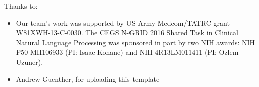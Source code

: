 \noindent
Thanks to:
\begin{itemize}
    \item Our team's work was supported by US Army Medcom/TATRC grant W81XWH-13-C-0030.
The CEGS N-GRID 2016 Shared Task in Clinical Natural Language Processing
 was sponsored in part by two NIH awards: NIH P50 MH106933 (PI: Isaac Kohane) and
NIH 4R13LM011411 (PI: Ozlem Uzuner).
    \item Andrew Guenther, for uploading this template
\end{itemize}
